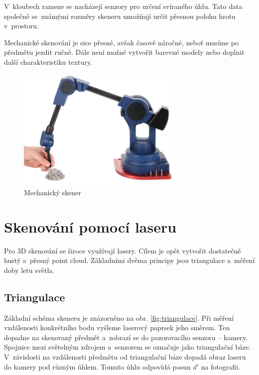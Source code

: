 \documentclass[12pt]{report}			%
\begin{document}
                V~kloubech ramene se nacházejí senzory pro určení svíraného úhlu. Tato data společně se~známými rozměry skeneru umožňují určit přesnou polohu hrotu v~prostoru. \cite{mapovaniporostredi}

                Mechanické skenování je sice přesné, avšak časově náročné, neboť musíme po předmětu jezdit ručně. Dále není možné vytvořit barevné modely nebo doplnit další charakteristiku textury. \cite{mapovaniporostredi}

                \begin{figure}[h]
                    \centering
                    \includegraphics[width=8cm]{images/mechanicalScenner.jpg}
                    \caption{Mechanický skener \cite{mechanickySkener}}
                \end{figure}

			\section{Skenování pomocí laseru}

			    Pro 3D skenování se široce využívají lasery. Cílem je opět vytvořit dostatečně hustý a~přesný point cloud. Základními dvěma principy jsou triangulace a~měření doby letu světla.

		    	\subsection{Triangulace}
    
    			    Základní schéma skeneru je znázorněno na obr. \ref{fig:triangulace}.
    			    Při měření vzdálenosti konkrétního bodu vyšleme laserový paprsek jeho směrem. Ten dopadne na skenovaný předmět a~zobrazí se do  pozorovacího senzoru -- kamery. Spojnice mezi světelným zdrojem a~senzorem se označuje jako triangulační báze. V~závislosti na vzdálenosti předmětu od triangulační báze dopadá obraz laseru do kamery pod různým úhlem. Tomuto úhlu odpovídá posun $d'$ na fotografii. \cite{triangulace1}
    
\end{document}

